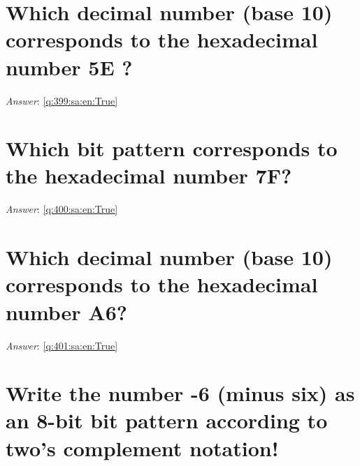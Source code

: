 \documentclass[a4paper,11pt,oneside]{book}
\begin{document}
\begin{sloppypar}
\section{Which decimal number (base 10) corresponds to the hexadecimal number  5E ?}

\label{q:399:sa:en:False}

\vspace{2cm}

\noindent\makebox[\textwidth]{\hrulefill}

\vspace{1cm}

\textit{Answer}: \autoref{q:399:sa:en:True}



\section{Which bit pattern corresponds to the hexadecimal number 7F?}

\label{q:400:sa:en:False}

\vspace{2cm}

\noindent\makebox[\textwidth]{\hrulefill}

\vspace{1cm}

\textit{Answer}: \autoref{q:400:sa:en:True}



\section{Which decimal number (base 10) corresponds to the hexadecimal number  A6?}

\label{q:401:sa:en:False}

\vspace{2cm}

\noindent\makebox[\textwidth]{\hrulefill}

\vspace{1cm}

\textit{Answer}: \autoref{q:401:sa:en:True}



\section{Write the number -6 (minus six) as an 8-bit bit pattern according to two's complement notation!}

\label{q:402:sa:en:False}


\end{sloppypar}
\end{document}
